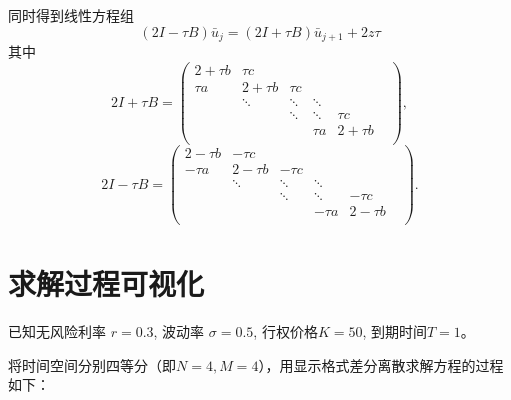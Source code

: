 \documentclass{article}
\begin{document}
同时得到线性方程组$$(2I - \tau B)\bar{u}_{j} = (2I + \tau B)\bar{u}_{j+1} + 2z\tau$$
其中
$$
2I + \tau B = \begin{pmatrix}
                2 +\tau b  &   \tau c     &            &            &            & \\
                \tau a     &   2 +\tau b  &   \tau c   &            &            & \\
                           &   \ddots     &   \ddots   &   \ddots   &            & \\
                           &              &   \ddots   &   \ddots   &  \tau c    & \\
                           &              &            &   \tau a   &  2 +\tau b & \\
            \end{pmatrix},
$$
$$
2I - \tau B = \begin{pmatrix}
                2 -\tau b  &   -\tau c    &            &            &            & \\
                -\tau a    &   2 -\tau b  &   -\tau c  &            &            & \\
                           &   \ddots     &   \ddots   &   \ddots   &            & \\
                           &              &   \ddots   &   \ddots   &  -\tau c   & \\
                           &              &            &   -\tau a  &  2 -\tau b & \\
            \end{pmatrix}.
$$





\newpage
\section{求解过程可视化}

已知无风险利率 $r = 0.3$, 波动率 $\sigma = 0.5$, 行权价格$K = 50$, 到期时间$T = 1$。

将时间空间分别四等分（即$N=4, M=4$），用显示格式差分离散求解方程的过程如下：
\end{document}
